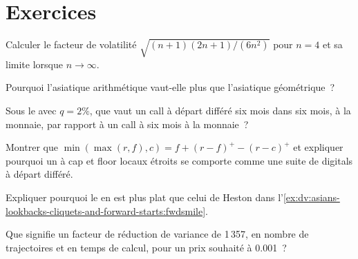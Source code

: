 \section{Exercices}

\begin{exercise}[$\star$]\label{exo:dv:asians-lookbacks-cliquets-and-forward-starts:1}
Calculer le facteur de volatilité $\sqrt{(n+1)(2n+1)/(6n^2)}$ pour $n=4$ et sa limite lorsque $n\to\infty$.
\end{exercise}

\begin{exercise}[$\star$]\label{exo:dv:asians-lookbacks-cliquets-and-forward-starts:2}
Pourquoi l'asiatique arithmétique vaut-elle plus que l'asiatique géométrique~?
\end{exercise}

\begin{exercise}[$\star$]\label{exo:dv:asians-lookbacks-cliquets-and-forward-starts:3}
Sous le  avec $q=2\%$, que vaut un call à départ différé six mois dans six mois, à la monnaie, par rapport à un
call à six mois à la monnaie~?
\end{exercise}

\begin{exercise}[$\star\star$]\label{exo:dv:asians-lookbacks-cliquets-and-forward-starts:4}
Montrer que $\min(\max(r,f),c)=f+(r-f)^+-(r-c)^+$ et expliquer pourquoi un  à cap et floor locaux étroits se comporte comme une
suite de digitals à départ différé.
\end{exercise}

\begin{exercise}[$\star\star$]\label{exo:dv:asians-lookbacks-cliquets-and-forward-starts:5}
Expliquer pourquoi le  en  est plus plat que celui de Heston dans
l'\cref{ex:dv:asians-lookbacks-cliquets-and-forward-starts:fwdsmile}.
\end{exercise}

\begin{exercise}[$\star\star$]\label{exo:dv:asians-lookbacks-cliquets-and-forward-starts:6}
Que signifie un facteur de réduction de variance de 1\,357, en nombre de trajectoires et en temps de calcul, pour un prix souhaité à 0.001~?
\end{exercise}

